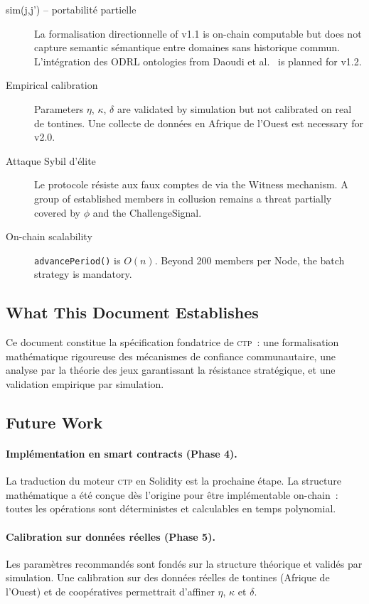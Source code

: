 \documentclass[12pt,a4paper]{article}
\theoremstyle{definition}
\theoremstyle{plain}
\theoremstyle{remark}
\newcommand{\CTP}{\textsc{ctp}}
\newcommand{\1}{\mathbf{1}}
\begin{document}
\begin{description}
  \item[sim(j,j') -- portabilité partielle] La formalisation directionnelle
    of v1.1 is on-chain computable but does not capture semantic
    sémantique entre domaines sans historique commun. L'intégration des
    ODRL ontologies from Daoudi et al.~\cite{daoudi2026negotiation} is
    planned for v1.2.

  \item[Empirical calibration] Parameters $\eta$, $\kappa$, $\delta$
    are validated by simulation but not calibrated on real
    de tontines. Une collecte de données en Afrique de l'Ouest est
    necessary for v2.0.

  \item[Attaque Sybil d'élite] Le protocole résiste aux faux comptes de
    via the Witness mechanism. A group of established members in
    collusion remains a threat partially covered by $\phi$ and the
    ChallengeSignal.

  \item[On-chain scalability] \texttt{advancePeriod()} is $O(n)$.
    Beyond 200 members per Node, the batch strategy is mandatory.
\end{description}

\subsection{What This Document Establishes}

Ce document constitue la spécification fondatrice de \CTP{}~:
une formalisation mathématique rigoureuse des mécanismes de confiance
communautaire, une analyse par la théorie des jeux garantissant la résistance
stratégique, et une validation empirique par simulation.

\subsection{Future Work}

\paragraph{Implémentation en smart contracts (Phase 4).}
La traduction du moteur \CTP{} en Solidity est la prochaine étape. La
structure mathématique a été conçue dès l'origine pour être implémentable
on-chain~: toutes les opérations sont déterministes et calculables en temps
polynomial.

\paragraph{Calibration sur données réelles (Phase 5).}
Les paramètres recommandés sont fondés sur la structure théorique et validés
par simulation. Une calibration sur des données réelles de tontines (Afrique
de l'Ouest) et de coopératives permettrait d'affiner $\eta$, $\kappa$ et
$\delta$.
\end{document}
